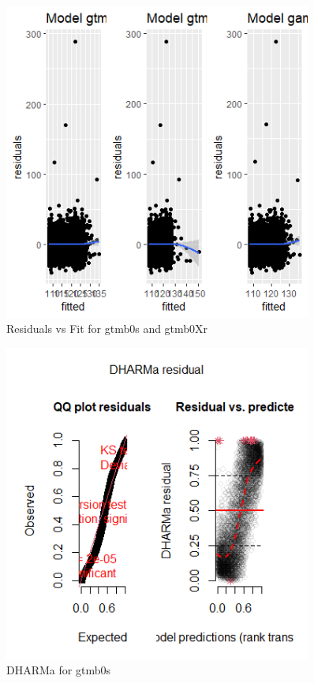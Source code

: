 \begin{figure}[h]
    \centering
    \includegraphics[width=0.9\textwidth]{visuals/ResVSfitgtmb0s.png}
    \caption{Residuals vs Fit for gtmb0s and gtmb0Xr}
    \label{fig:modfitgtmb7}
\end{figure}

\begin{figure}[h]
    \centering
    \includegraphics[width=0.9\textwidth]{visuals/DHARMagtmb0s.png}
    \caption{DHARMa for gtmb0s}
    \label{fig:modfitgtmb7}
\end{figure}


